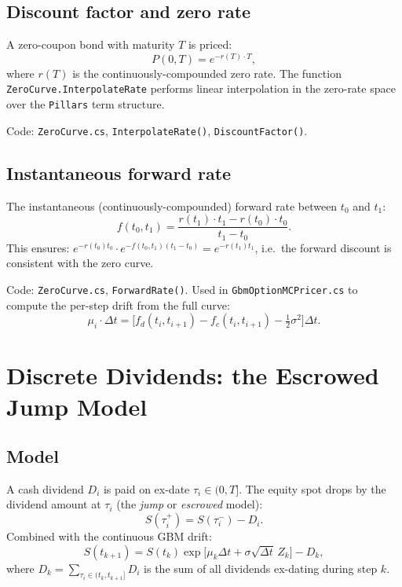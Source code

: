 \documentclass[11pt,a4paper]{article}
\newcommand{\coderef}[1]{\texttt{\color{blue!60!black}#1}}
\theoremstyle{definition}
\begin{document}
\subsection{Discount factor and zero rate}

A zero-coupon bond with maturity $T$ is priced:
\[
  P(0,T) = e^{-r(T)\cdot T},
\]
where $r(T)$ is the continuously-compounded zero rate.  The function
\texttt{ZeroCurve.InterpolateRate} performs linear interpolation in the
zero-rate space over the \texttt{Pillars} term structure.

Code: \coderef{ZeroCurve.cs}, \texttt{InterpolateRate()}, \texttt{DiscountFactor()}.

\subsection{Instantaneous forward rate}

The instantaneous (continuously-compounded) forward rate between $t_0$ and $t_1$:
\[
  f(t_0,t_1) = \frac{r(t_1)\cdot t_1 - r(t_0)\cdot t_0}{t_1-t_0}.
\]
This ensures: $e^{-r(t_0)t_0}\cdot e^{-f(t_0,t_1)(t_1-t_0)}=e^{-r(t_1)t_1}$,
i.e.\ the forward discount is consistent with the zero curve.

Code: \coderef{ZeroCurve.cs}, \texttt{ForwardRate()}.  Used in
\coderef{GbmOptionMCPricer.cs} to compute the per-step drift from the full
curve:
\[
  \mu_i\cdot\Delta t = \bigl[f_d(t_i,t_{i+1})-f_c(t_i,t_{i+1})-\tfrac{1}{2}\sigma^2\bigr]\Delta t.
\]

\section{Discrete Dividends: the Escrowed Jump Model}
\label{sec:dividends}

\subsection{Model}

A cash dividend $D_i$ is paid on ex-date $\tau_i\in(0,T]$.  The equity spot
drops by the dividend amount at $\tau_i$ (the \emph{jump} or \emph{escrowed}
model):
\[
  S(\tau_i^+) = S(\tau_i^-) - D_i.
\]
Combined with the continuous GBM drift:
\[
  S(t_{k+1}) = S(t_k)\exp\!\bigl[\mu_k\Delta t + \sigma\sqrt{\Delta t}\,Z_k\bigr]
               - D_k,
\]
where $D_k = \sum_{\tau_i\in(t_k,t_{k+1}]}D_i$ is the sum of all dividends
ex-dating during step $k$.
\end{document}
